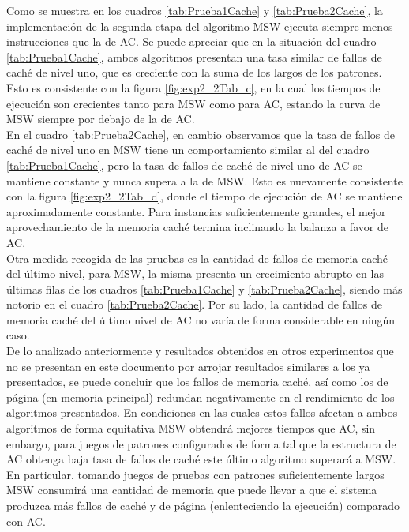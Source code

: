 {Como se muestra en los cuadros \ref{tab:Prueba1Cache} y \ref{tab:Prueba2Cache}, la implementación de la segunda etapa del algoritmo MSW ejecuta siempre menos instrucciones que la de AC. Se puede apreciar que en la situación del cuadro \ref{tab:Prueba1Cache}, ambos algoritmos presentan una tasa similar de fallos de caché de nivel uno, que es creciente con la suma de los largos de los patrones. Esto es consistente con la figura \ref{fig:exp2_2Tab_c}, en la cual los tiempos de ejecución son crecientes tanto para MSW como para AC, estando la curva de MSW siempre por debajo de la de AC.\\
En el cuadro \ref{tab:Prueba2Cache}, en cambio observamos que la tasa de fallos de caché de nivel uno en MSW tiene un comportamiento similar al del cuadro \ref{tab:Prueba1Cache}, pero la tasa de fallos de caché de nivel uno de AC se mantiene constante y nunca supera a la de MSW. Esto es nuevamente consistente con la figura \ref{fig:exp2_2Tab_d}, donde el tiempo de ejecución de AC se mantiene aproximadamente constante. Para instancias suficientemente grandes, el mejor aprovechamiento de la memoria caché termina inclinando la balanza a favor de AC.\\
Otra medida recogida de las pruebas es la cantidad de fallos de memoria caché del último nivel, para MSW, la misma presenta un crecimiento abrupto en las últimas filas de los cuadros \ref{tab:Prueba1Cache} y \ref{tab:Prueba2Cache}, siendo más notorio en el cuadro \ref{tab:Prueba2Cache}. Por su lado, la cantidad de fallos de memoria caché del último nivel de AC no varía de forma considerable en ningún caso.\\
De lo analizado anteriormente y resultados obtenidos en otros experimentos que no se presentan en este documento por arrojar resultados similares a los ya presentados, se puede concluir que los fallos de memoria caché, así como los de página (en memoria principal) redundan negativamente en el rendimiento de los algoritmos presentados. En condiciones en las cuales estos fallos afectan a ambos algoritmos de forma equitativa MSW obtendrá mejores tiempos que AC, sin embargo, para juegos de patrones configurados de forma tal que la estructura de AC obtenga baja tasa de fallos de caché este último algoritmo superará a MSW. En particular, tomando juegos de pruebas con patrones suficientemente largos MSW consumirá una cantidad de memoria que puede llevar a que el sistema produzca más fallos de caché y de página (enlenteciendo la ejecución) comparado con AC.
}
